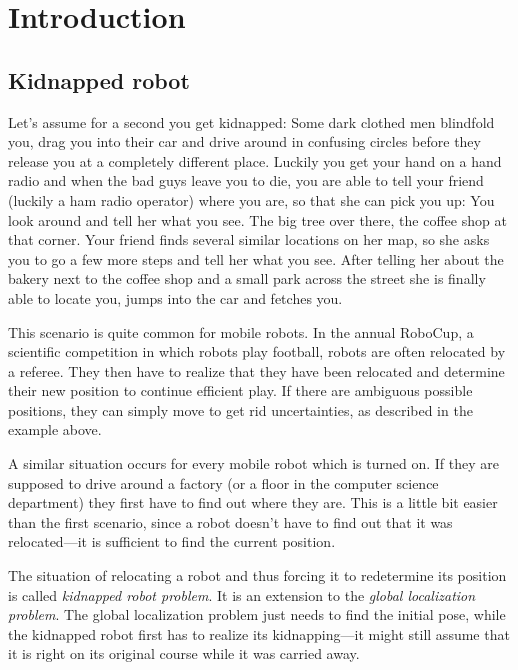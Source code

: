 \documentclass[Thesis.tex]{subfiles}
\begin{document}
\chapter{Introduction}

\section{Kidnapped robot}

Let's assume for a second you get kidnapped: Some dark clothed men blindfold you, drag you into their car and drive around in confusing circles before they release you at a completely different place. Luckily you get your hand on a hand radio and when the bad guys leave you to die, you are able to tell your friend (luckily a ham radio operator) where you are, so that she can pick you up: You look around and tell her what you see. The big tree over there, the coffee shop at that corner. Your friend finds several similar locations on her map, so she asks you to go a few more steps and tell her what you see. After telling her about the bakery next to the coffee shop and a small park across the street she is finally able to locate you, jumps into the car and fetches you.

This scenario is quite common for mobile robots. In the annual RoboCup, a scientific competition in which robots play football\cite{robocup}, robots are often relocated by a referee\cite{ThrunBurgardFox:2005}. They then have to realize that they have been relocated and determine their new position to continue efficient play. If there are ambiguous possible positions, they can simply move to get rid uncertainties, as described in the example above.

A similar situation occurs for every mobile robot which is turned on. If they are supposed to drive around a factory (or a floor in the computer science department) they first have to find out where they are. This is a little bit easier than the first scenario, since a robot doesn't have to find out that it was relocated---it is sufficient to find the current position.

The situation of relocating a robot and thus forcing it to redetermine its position is called \emph{kidnapped robot problem}\cite{ThrunBurgardFox:2005}. It is an extension to the \emph{global localization problem}. The global localization problem just needs to find the initial pose, while the kidnapped robot first has to realize its kidnapping---it might still assume that it is right on its original course while it was carried away.
\end{document}
